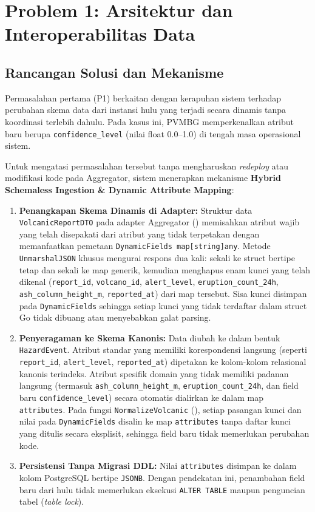 \section{Problem 1: Arsitektur dan Interoperabilitas Data}

\subsection{Rancangan Solusi dan Mekanisme}
Permasalahan pertama (P1) berkaitan dengan kerapuhan sistem terhadap perubahan skema data dari instansi hulu yang terjadi secara dinamis tanpa koordinasi terlebih dahulu. Pada kasus ini, PVMBG memperkenalkan atribut baru berupa \texttt{confidence\_level} (nilai float 0.0--1.0) di tengah masa operasional sistem.

Untuk mengatasi permasalahan tersebut tanpa mengharuskan \textit{redeploy} atau modifikasi kode pada Aggregator, sistem menerapkan mekanisme \textbf{Hybrid Schemaless Ingestion \& Dynamic Attribute Mapping}:
\begin{enumerate}
    \item \textbf{Penangkapan Skema Dinamis di Adapter:} Struktur data \texttt{VolcanicReportDTO} pada adapter Aggregator () memisahkan atribut wajib yang telah disepakati dari atribut yang tidak terpetakan dengan memanfaatkan pemetaan \texttt{DynamicFields map[string]any}. Metode \texttt{UnmarshalJSON} khusus mengurai respons dua kali: sekali ke struct bertipe tetap dan sekali ke map generik, kemudian menghapus enam kunci yang telah dikenal (\texttt{report\_id}, \texttt{volcano\_id}, \texttt{alert\_level}, \texttt{eruption\_count\_24h}, \texttt{ash\_column\_height\_m}, \texttt{reported\_at}) dari map tersebut. Sisa kunci disimpan pada \texttt{DynamicFields} sehingga setiap kunci yang tidak terdaftar dalam struct Go tidak dibuang atau menyebabkan galat parsing.
    \item \textbf{Penyeragaman ke Skema Kanonis:} Data diubah ke dalam bentuk \texttt{HazardEvent}. Atribut standar yang memiliki korespondensi langsung (seperti \texttt{report\_id}, \texttt{alert\_level}, \texttt{reported\_at}) dipetakan ke kolom-kolom relasional kanonis terindeks. Atribut spesifik domain yang tidak memiliki padanan langsung (termasuk \texttt{ash\_column\_height\_m}, \texttt{eruption\_count\_24h}, dan field baru \texttt{confidence\_level}) secara otomatis dialirkan ke dalam map \texttt{attributes}. Pada fungsi \texttt{NormalizeVolcanic} (), setiap pasangan kunci dan nilai pada \texttt{DynamicFields} disalin ke map \texttt{attributes} tanpa daftar kunci yang ditulis secara eksplisit, sehingga field baru tidak memerlukan perubahan kode.
    \item \textbf{Persistensi Tanpa Migrasi DDL:} Nilai \texttt{attributes} disimpan ke dalam kolom PostgreSQL bertipe \texttt{JSONB}. Dengan pendekatan ini, penambahan field baru dari hulu tidak memerlukan eksekusi \texttt{ALTER TABLE} maupun penguncian tabel (\textit{table lock}).
\end{enumerate}

